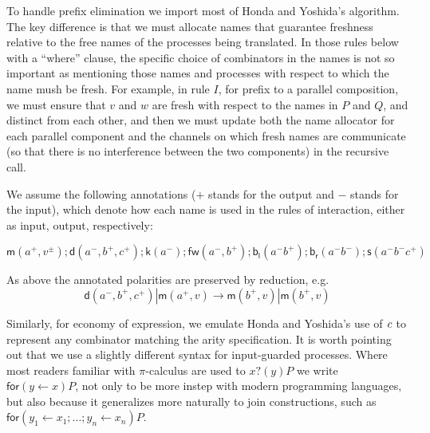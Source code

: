 \documentclass[submission,copyright,creativecommons]{eptcs}
\newcommand{\pic}{$\pi$-calculus}
\newcommand{\binpar}[2]{#1 | #2}
\theoremstyle{definition}
\theoremstyle{remark}
\theoremstyle{remark}
\begin{document}
To handle prefix elimination we import most of Honda and Yoshida's
algorithm. The key difference is that we must allocate names that
guarantee freshness relative to the free names of the processes being
translated. In those rules below with a ``where'' clause, the specific
choice of combinators in the names is not so important as mentioning
those names and processes with respect to which the name mush be fresh.
For example, in rule $I$, for prefix to a parallel
composition, we must ensure that $v$ and $w$ are fresh with respect to
the names in $P$ and $Q$, and distinct from each other, and then we
must update both the name allocator for each parallel component and
the channels on which fresh names are communicate (so that there is no
interference between the two components) in the recursive call. 

We assume the following annotations ($+$ stands for the output and $-$
stands for the input), which denote how each name is used in the rules
of interaction, either as input, output, respectively:

\[\mathsf{m}(a^{+},v^{\pm});\mathsf{d}(a^{-},b^{+},c^{+});\mathsf{k}(a^{-});\mathsf{fw}(a^{-},b^{+});\mathsf{b}_{\mathsf{l}}(a^{-}b^{+});\mathsf{b}_{\mathsf{r}}(a^{-}b^{-});\mathsf{s}(a^{-}b^{-}c^{+})\]

As above the annotated polarities are preserved by reduction, e.g.
\[\binpar{\mathsf{d}(a^{-},b^{+},c^{+})}{\mathsf{m}(a^{+},v)} \to \binpar{\mathsf{m}(b^{+},v)}{\mathsf{m}(b^{+},v)}\]

Similarly, for economy of expression, we emulate Honda and Yoshida's
use of $\emph{c}$ to represent any combinator matching the arity
specification. It is worth pointing out that we use a slightly
different syntax for input-guarded processes. Where most readers
familiar with {\pic} are used to $x?(y)P$ we write $\mathsf{for}(y
\leftarrow x)P$, not only to be more instep with modern programming
languages, but also because it generalizes more naturally to join
constructions, such as $\mathsf{for}(y_1 \leftarrow x_1; \ldots; y_n
\leftarrow x_n)P$.
\end{document}
